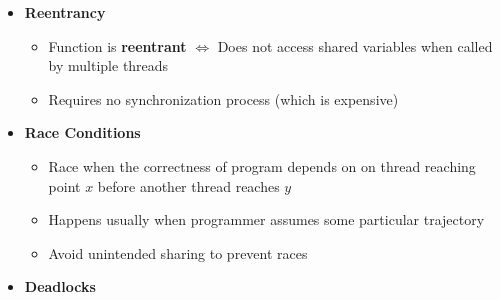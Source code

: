 \documentclass[12pt]{article}
\begin{document}
{\begin{itemize}
\begin{itemize}
\begin{enumerate}
					\item Functions that do not protect \textit{shared variables}
					\begin{itemize}
						\item Use \texttt{P}, \texttt{V} operations to synchronize
					\end{itemize}
					\item Functions that keep \textit{states across multiple invocations}
					\begin{itemize}
						\item Modify function to be \textit{re-entrant}
					\end{itemize}
					\item Functions that return a \textit{pointer to a static variable}
					\begin{itemize}
						\item Rewrite function so caller passes address of variable to store result
						\item Lock and copy: Lock and copy to a another private memory location to store the result (write a wrapper function)
					\end{itemize}
					\item Functions that call other unsafe functions
					\begin{itemize}
						\item Just don't call them
					\end{itemize}
				\end{enumerate}
			\end{itemize}	
			\item \textbf{Reentrancy}
			\begin{itemize}
				\item Function is \textbf{reentrant} $\iff$ Does not access shared variables when called by multiple threads
				\item Requires no synchronization process (which is expensive)
			\end{itemize}
			\item \textbf{Race Conditions}
			\begin{itemize}
				\item Race when the correctness of program depends on on thread reaching point $ x $ before another thread reaches $ y $
				\item Happens usually when programmer assumes some particular trajectory
				\item Avoid unintended sharing to prevent races
			\end{itemize}
			\item \textbf{Deadlocks}

\end{itemize}}
\end{document}

